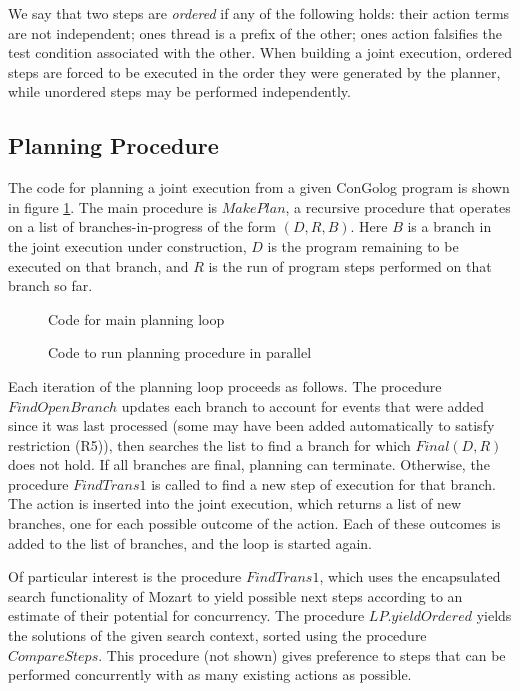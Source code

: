 We say that two steps are \emph{ordered} if any of the following holds:
their action terms are not independent; ones thread is a prefix of
the other; ones action falsifies the test condition associated with
the other. When building a joint execution, ordered steps are forced
to be executed in the order they were generated by the planner, while
unordered steps may be performed independently.


\subsection{Planning Procedure}

The code for planning a joint execution from a given ConGolog program
is shown in figure \ref{fig:planning-code}. The main procedure is
$MakePlan$, a recursive procedure that operates on a list of branches-in-progress
of the form $(D,R,B)$. Here $B$ is a branch in the joint execution
under construction, $D$ is the program remaining to be executed on
that branch, and $R$ is the run of program steps performed on that
branch so far.

%
\begin{figure}

\caption{ Code for main planning loop }


\label{fig:planning-code} 
\end{figure}


%
\begin{figure}

\caption{ Code to run planning procedure in parallel }


\label{fig:parallel-search} 
\end{figure}


Each iteration of the planning loop proceeds as follows. The procedure
$FindOpenBranch$ updates each branch to account for events that were
added since it was last processed (some may have been added automatically
to satisfy restriction (R5)), then searches the list to find a branch
for which $Final(D,R)$ does not hold. If all branches are final,
planning can terminate. Otherwise, the procedure $FindTrans1$ is
called to find a new step of execution for that branch. The action
is inserted into the joint execution, which returns a list of new
branches, one for each possible outcome of the action. Each of these
outcomes is added to the list of branches, and the loop is started
again.

Of particular interest is the procedure $FindTrans1$, which uses
the encapsulated search functionality of Mozart to yield possible
next steps according to an estimate of their potential for concurrency.
The procedure $LP.yieldOrdered$ yields the solutions of the given
search context, sorted using the procedure $CompareSteps$. This procedure
(not shown) gives preference to steps that can be performed concurrently
with as many existing actions as possible.


